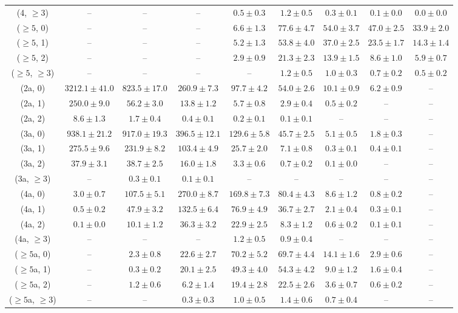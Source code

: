 \begin{table}[h!]
{\begin{tabular}{ccccccccc}
	(4, $\ge3$) & -- & -- & -- & $0.5\pm 0.3$ & $1.2\pm 0.5$ & $0.3\pm 0.1$ & $0.1\pm 0.0$ & $0.0\pm 0.0$ \\[0.5ex] 
	($\ge5$, 0) & -- & -- & -- & $6.6\pm 1.3$ & $77.6\pm 4.7$ & $54.0\pm 3.7$ & $47.0\pm 2.5$ & $33.9\pm 2.0$ \\[0.5ex] 
	($\ge5$, 1) & -- & -- & -- & $5.2\pm 1.3$ & $53.8\pm 4.0$ & $37.0\pm 2.5$ & $23.5\pm 1.7$ & $14.3\pm 1.4$ \\[0.5ex] 
	($\ge5$, 2) & -- & -- & -- & $2.9\pm 0.9$ & $21.3\pm 2.3$ & $13.9\pm 1.5$ & $8.6\pm 1.0$ & $5.9\pm 0.7$ \\[0.5ex] 
	($\ge5$, $\ge3$) & -- & -- & -- & -- & $1.2\pm 0.5$ & $1.0\pm 0.3$ & $0.7\pm 0.2$ & $0.5\pm 0.2$ \\[0.5ex] 
	(2a, 0) & $3212.1\pm 41.0$ & $823.5\pm 17.0$ & $260.9\pm 7.3$ & $97.7\pm 4.2$ & $54.0\pm 2.6$ & $10.1\pm 0.9$ & $6.2\pm 0.9$ & -- \\[0.5ex] 
	(2a, 1) & $250.0\pm 9.0$ & $56.2\pm 3.0$ & $13.8\pm 1.2$ & $5.7\pm 0.8$ & $2.9\pm 0.4$ & $0.5\pm 0.2$ & -- & -- \\[0.5ex] 
	(2a, 2) & $8.6\pm 1.3$ & $1.7\pm 0.4$ & $0.4\pm 0.1$ & $0.2\pm 0.1$ & $0.1\pm 0.1$ & -- & -- & -- \\[0.5ex] 
	(3a, 0) & $938.1\pm 21.2$ & $917.0\pm 19.3$ & $396.5\pm 12.1$ & $129.6\pm 5.8$ & $45.7\pm 2.5$ & $5.1\pm 0.5$ & $1.8\pm 0.3$ & -- \\[0.5ex] 
	(3a, 1) & $275.5\pm 9.6$ & $231.9\pm 8.2$ & $103.4\pm 4.9$ & $25.7\pm 2.0$ & $7.1\pm 0.8$ & $0.3\pm 0.1$ & $0.4\pm 0.1$ & -- \\[0.5ex] 
	(3a, 2) & $37.9\pm 3.1$ & $38.7\pm 2.5$ & $16.0\pm 1.8$ & $3.3\pm 0.6$ & $0.7\pm 0.2$ & $0.1\pm 0.0$ & -- & -- \\[0.5ex] 
	(3a, $\ge3$) & -- & $0.3\pm 0.1$ & $0.1\pm 0.1$ & -- & -- & -- & -- & -- \\[0.5ex] 
	(4a, 0) & $3.0\pm 0.7$ & $107.5\pm 5.1$ & $270.0\pm 8.7$ & $169.8\pm 7.3$ & $80.4\pm 4.3$ & $8.6\pm 1.2$ & $0.8\pm 0.2$ & -- \\[0.5ex] 
	(4a, 1) & $0.5\pm 0.2$ & $47.9\pm 3.2$ & $132.5\pm 6.4$ & $76.9\pm 4.9$ & $36.7\pm 2.7$ & $2.1\pm 0.4$ & $0.3\pm 0.1$ & -- \\[0.5ex] 
	(4a, 2) & $0.1\pm 0.0$ & $10.1\pm 1.2$ & $36.3\pm 3.2$ & $22.9\pm 2.5$ & $8.3\pm 1.2$ & $0.6\pm 0.2$ & $0.1\pm 0.1$ & -- \\[0.5ex] 
	(4a, $\ge3$) & -- & -- & -- & $1.2\pm 0.5$ & $0.9\pm 0.4$ & -- & -- & -- \\[0.5ex] 
	($\ge5$a, 0) & -- & $2.3\pm 0.8$ & $22.6\pm 2.7$ & $70.2\pm 5.2$ & $69.7\pm 4.4$ & $14.1\pm 1.6$ & $2.9\pm 0.6$ & -- \\[0.5ex] 
	($\ge5$a, 1) & -- & $0.3\pm 0.2$ & $20.1\pm 2.5$ & $49.3\pm 4.0$ & $54.3\pm 4.2$ & $9.0\pm 1.2$ & $1.6\pm 0.4$ & -- \\[0.5ex] 
	($\ge5$a, 2) & -- & $1.2\pm 0.6$ & $6.2\pm 1.4$ & $19.4\pm 2.8$ & $22.5\pm 2.6$ & $3.6\pm 0.7$ & $0.6\pm 0.2$ & -- \\[0.5ex] 
	($\ge5$a, $\ge3$) & -- & -- & $0.3\pm 0.3$ & $1.0\pm 0.5$ & $1.4\pm 0.6$ & $0.7\pm 0.4$ & -- & -- \\[0.5ex] 
	\hline
	\hline
\end{tabular}}
\end{table}
